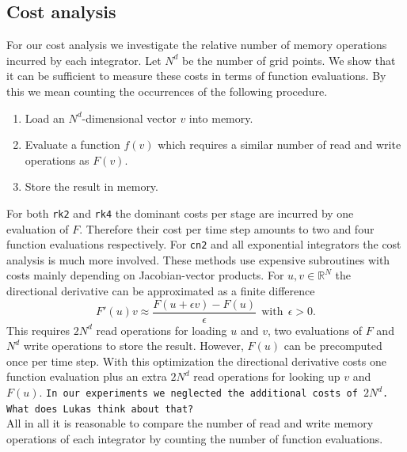 \documentclass{scrartcl}
\begin{document}
	\subsection{Cost analysis}
	For our cost analysis we investigate the relative number of memory operations incurred by each integrator. Let $N^d$ be the number of grid points. We show that it can be sufficient to measure these costs in terms of function evaluations. By this we mean counting the occurrences of the following procedure. 
	\begin{enumerate}
		\item Load an $N^d$-dimensional vector $v$ into memory.
		\item Evaluate a function $f(v)$ which requires a similar number of read and write operations as $F(v)$.
		\item Store the result in memory.
	\end{enumerate}
	For both \texttt{rk2} and \texttt{rk4} the dominant costs per stage are incurred by one evaluation of $F$. Therefore their cost per time step amounts to two and four function evaluations respectively.
	For \texttt{cn2} and all exponential integrators the cost analysis is much more involved. These methods use expensive subroutines with costs mainly depending on Jacobian-vector products. For $u, v\in\mathbb{R}^{N}$ the directional derivative can be approximated as a finite difference
	\[
	F'(u)v \approx \frac{F(u+\epsilon v)-F(u)}{\epsilon} ~~\text{with}~~ \epsilon > 0.
	\]
	This requires $2N^d$ read operations for loading $u$ and $v$, two evaluations of $F$ and $N^d$ write operations to store the result. 
	However, $F(u)$ can be precomputed once per time step. With this optimization the directional derivative costs one function evaluation plus an extra $2N^d$ read operations for looking up $v$ and $F(u)$. \texttt{In our experiments we neglected the additional costs of $2N^d$. What does Lukas think about that?} \\
	All in all it is reasonable to compare the number of read and write memory operations of each integrator by counting the number of function evaluations.
	
\end{document}
